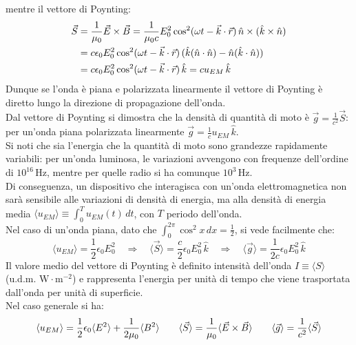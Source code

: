 mentre il vettore di Poynting:
\begin{equation}
	\begin{split}
		\vec{S} &= \frac{1}{\mu_0} \vec{E}\times\vec{B} = \frac{1}{\mu_0 c} E_0^2 \cos^2 (\omega t - \vec{k}\cdot\vec{r}) \,\hat{n}\times(\hat{k}\times\hat{n}) \\ 
			&= c \epsilon_0 E_0^2 \cos^2 (\omega t - \vec{k}\cdot\vec{r}) \, (\hat{k}(\hat{n}\cdot\hat{n}) - \hat{n}(\hat{k}\cdot\hat{n})) \\ 
			&= c \epsilon_0 E_0^2 \cos^2 (\omega t - \vec{k}\cdot\vec{r}) \,\hat{k} = c u_{EM} \,\hat{k}
	\end{split}
	\label{eq:41}
\end{equation}
Dunque se l'onda è piana e polarizzata linearmente il vettore di Poynting è diretto lungo la direzione di propagazione dell'onda. \\ 
%
Dal vettore di Poynting si dimostra che la densità di quantità di moto è $ \vec{g} = \frac{1}{c^2} \vec{S} $: per un'onda piana polarizzata linearmente $ \vec{g} = \frac{1}{c}u_{EM} \,\hat{k} $. \\ 
Si noti che sia l'energia che la quantità di moto sono grandezze rapidamente variabili: per un'onda luminosa, le variazioni avvengono con frequenze dell'ordine di $ 10^{16}\,\text{Hz} $, mentre per quelle radio si ha comunque $ 10^3\,\text{Hz} $. \\ 
Di conseguenza, un dispositivo che interagisca con un'onda elettromagnetica non sarà sensibile alle variazioni di densità di energia, ma alla densità di energia media $ \langle u_{EM} \rangle \equiv \int_0^T u_{EM}(t) \,dt $, con $ T $ periodo dell'onda. \\ 
%
Nel caso di un'onda piana, dato che $ \int_0^{2\pi} \cos^2 x\,dx = \frac{1}{2} $, si vede facilmente che:
\begin{equation}
	\langle u_{EM} \rangle = \frac{1}{2} \epsilon_0 E_0^2 \quad\Longrightarrow\quad \langle \vec{S} \rangle = \frac{c}{2} \epsilon_0 E_0^2 \,\hat{k} \quad\Longrightarrow\quad \langle \vec{g} \rangle = \frac{1}{2c} \epsilon_0 E_0^2 \,\hat{k}
	\label{eq:42}
\end{equation}
Il valore medio del vettore di Poynting è definito intensità dell'onda $ I \equiv \langle S \rangle $ (u.d.m. $ \text{W}\cdot\text{m}^{-2} $) e rappresenta l'energia per unità di tempo che viene trasportata dall'onda per unità di superficie. \\ 
%
Nel caso generale si ha:
\begin{equation}
	\langle u_{EM} \rangle = \frac{1}{2} \epsilon_0 \langle E^2 \rangle + \frac{1}{2\mu_0} \langle B^2 \rangle \qquad \langle \vec{S} \rangle = \frac{1}{\mu_0} \langle \vec{E}\times\vec{B} \rangle \qquad \langle \vec{g} \rangle = \frac{1}{c^2} \langle \vec{S} \rangle
	\label{eq:43}
\end{equation}

